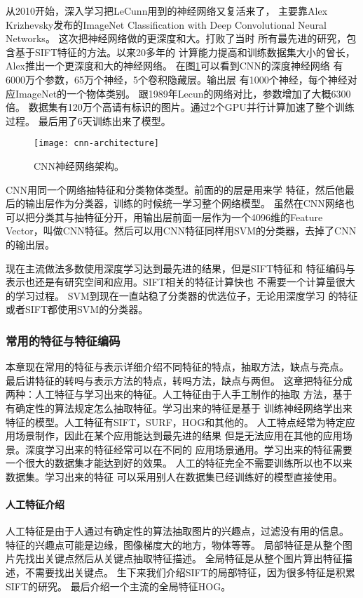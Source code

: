 从2010开始，深入学习把LeCunn用到的神经网络又复活来了，
主要靠Alex Krizhevsky发布的ImageNet Classification with Deep Convolutional Neural Networks。
这次把神经网络做的更深度和大。打败了当时
所有最先进的研究，包含基于SIFT特征的方法。以来20多年的
计算能力提高和训练数据集大小的曾长，Alex推出一个更深度和大的神经网络。
在图\ref{fig:cnn-architecture}可以看到CNN的深度神经网络
有6000万个参数，65万个神经，5个卷积隐藏层。输出层
有1000个神经，每个神经对应ImageNet的一个物体类别。
跟1989年Lecun的网络对比，参数增加了大概6300倍。
数据集有120万个高请有标识的图片。通过2个GPU并行计算加速了整个训练过程。
最后用了6天训练出来了模型。\cite{krizhevsky2012imagenet,lee2009convolutional}
\begin{figure}[H]
  \centering
    \texttt{[image: cnn-architecture]}
  \caption{CNN神经网络架构。\cite{krizhevsky2012imagenet}}
  \label{fig:cnn-architecture}
\end{figure}

CNN用同一个网络抽特征和分类物体类型。前面的的层是用来学
特征，然后他最后的输出层作为分类器，训练的时候统一学习整个网络模型。
虽然在CNN网络也可以把分类其与抽特征分开，用输出层前面一层作为一个4096维的Feature 
Vector，叫做CNN特征。然后可以用CNN特征同样用SVM的分类器，去掉了CNN的输出层。
\cite{Razavian_2014_CVPR_Workshops}

现在主流做法多数使用深度学习达到最先进的结果，但是SIFT特征和
特征编码与表示也还是有研究空间和应用。SIFT相关的特征计算快也
不需要一个计算量很大的学习过程。
SVM到现在一直站稳了分类器的优选位子，无论用深度学习
的特征或者SIFT都使用SVM的分类器。

\subsubsection{常用的特征与特征编码}
\label{subsubsec:image_features}
本章现在常用的特征与表示详细介绍不同特征的特点，抽取方法，缺点与亮点。
最后讲特征的转吗与表示方法的特点，转吗方法，缺点与两但。
这章把特征分成两种：人工特征与学习出来的特征。人工特征由于人手工制作的抽取
方法，基于有确定性的算法规定怎么抽取特征。学习出来的特征是基于
训练神经网络学出来特征的模型。人工特征有SIFT，SURF，HOG和其他的。
人工特点经常为特定应用场景制作，因此在某个应用能达到最先进的结果
但是无法应用在其他的应用场景。深度学习出来的特征经常可以在不同的
应用场景通用。学习出来的特征需要一个很大的数据集才能达到好的效果。
人工的特征完全不需要训练所以也不以来数据集。学习出来的特征
可以采用别人在数据集已经训练好的模型直接使用。

\paragraph{人工特征介绍}
人工特征是由于人通过有确定性的算法抽取图片的兴趣点，过滤没有用的信息。
特征的兴趣点可能是边缘，图像梯度大的地方，物体等等。
局部特征是从整个图片先找出关键点然后从关键点抽取特征描述。
全局特征是从整个图片算出特征描述，不需要找出关键点。
生下来我们介绍SIFT的局部特征，因为很多特征是积累SIFT的研究。
最后介绍一个主流的全局特征HOG。

